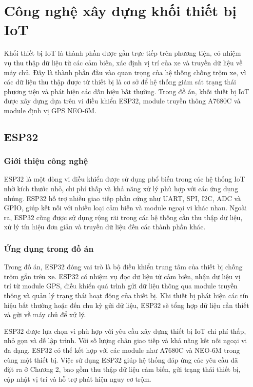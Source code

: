 \documentclass[../DoAn.tex]{subfiles}
\begin{document}
\section{Công nghệ xây dựng khối thiết bị IoT}
\label{section:3.iot_device}

Khối thiết bị IoT là thành phần được gắn trực tiếp trên phương tiện, có nhiệm vụ thu thập dữ liệu từ các cảm biến, xác định vị trí của xe và truyền dữ liệu về máy chủ. Đây là thành phần đầu vào quan trọng của hệ thống chống trộm xe, vì các dữ liệu thu thập được từ thiết bị là cơ sở để hệ thống giám sát trạng thái phương tiện và phát hiện các dấu hiệu bất thường. Trong đồ án, khối thiết bị IoT được xây dựng dựa trên vi điều khiển ESP32, module truyền thông A7680C và module định vị GPS NEO-6M.

\subsection{ESP32}
\label{subsection:3.esp32}

\subsubsection{Giới thiệu công nghệ}

ESP32 là một dòng vi điều khiển được sử dụng phổ biến trong các hệ thống IoT nhờ kích thước nhỏ, chi phí thấp và khả năng xử lý phù hợp với các ứng dụng nhúng. ESP32 hỗ trợ nhiều giao tiếp phần cứng như UART, SPI, I2C, ADC và GPIO, giúp kết nối với nhiều loại cảm biến và module ngoại vi khác nhau. Ngoài ra, ESP32 cũng được sử dụng rộng rãi trong các hệ thống cần thu thập dữ liệu, xử lý tín hiệu đơn giản và truyền dữ liệu đến các thành phần khác.

\subsubsection{Ứng dụng trong đồ án}

Trong đồ án, ESP32 đóng vai trò là bộ điều khiển trung tâm của thiết bị chống trộm gắn trên xe. ESP32 có nhiệm vụ đọc dữ liệu từ cảm biến, nhận dữ liệu vị trí từ module GPS, điều khiển quá trình gửi dữ liệu thông qua module truyền thông và quản lý trạng thái hoạt động của thiết bị. Khi thiết bị phát hiện các tín hiệu bất thường hoặc đến chu kỳ gửi dữ liệu, ESP32 sẽ tổng hợp dữ liệu cần thiết và gửi về máy chủ để xử lý.

ESP32 được lựa chọn vì phù hợp với yêu cầu xây dựng thiết bị IoT chi phí thấp, nhỏ gọn và dễ lập trình. Với số lượng chân giao tiếp và khả năng kết nối ngoại vi đa dạng, ESP32 có thể kết hợp với các module như A7680C và NEO-6M trong cùng một thiết bị. Việc sử dụng ESP32 giúp hệ thống đáp ứng các yêu cầu đã đặt ra ở Chương 2, bao gồm thu thập dữ liệu cảm biến, gửi trạng thái thiết bị, cập nhật vị trí và hỗ trợ phát hiện nguy cơ trộm.
\end{document}
